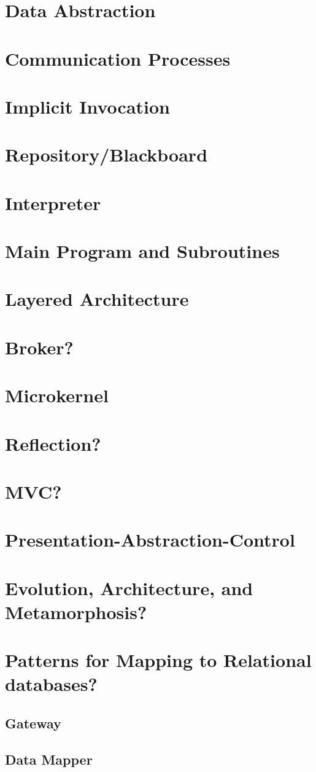\documentclass[a4paper,12pt]{scrreprt}
\begin{document}
\section{Data Abstraction}
\section{Communication Processes}
\section{Implicit Invocation}
\section{Repository/Blackboard}
\section{Interpreter}
\section{Main Program and Subroutines}
\section{Layered Architecture}
\section{Broker?}
\section{Microkernel}
\section{Reflection?}
\section{MVC?}
\section{Presentation-Abstraction-Control}
\section{Evolution, Architecture, and Metamorphosis?}
\section{Patterns for Mapping to Relational databases?}
\subsection{Gateway}
\subsection{Data Mapper}


%

\end{document}
